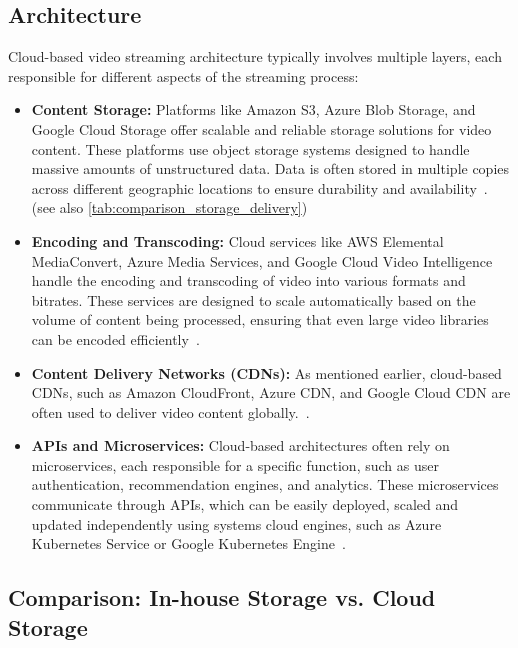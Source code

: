 \subsection{Architecture}
Cloud-based video streaming architecture typically involves multiple layers, each responsible for different aspects of the streaming process:

\begin{itemize}
    \item \textbf{Content Storage:} Platforms like Amazon S3, Azure Blob Storage, and Google Cloud Storage offer scalable and reliable storage solutions for video content. These platforms use object storage systems designed to handle massive amounts of unstructured data. Data is often stored in multiple copies across different geographic locations to ensure durability and availability~\parencite{cloud_streaming}. (see also \autoref{tab:comparison_storage_delivery})
    
    \item \textbf{Encoding and Transcoding:} Cloud services like AWS Elemental MediaConvert, Azure Media Services, and Google Cloud Video Intelligence handle the encoding and transcoding of video into various formats and bitrates. These services are designed to scale automatically based on the volume of content being processed, ensuring that even large video libraries can be encoded efficiently~\parencite{cloud_streaming}.
    
    \item \textbf{Content Delivery Networks (CDNs):} As mentioned earlier, cloud-based \ac{CDN}s, such as Amazon CloudFront, Azure CDN, and Google Cloud CDN are often used to deliver video content globally.~\parencite{cloud_streaming}.
    
    \item \textbf{\ac{API}s and Microservices:} Cloud-based architectures often rely on microservices, each responsible for a specific function, such as user authentication, recommendation engines, and analytics. These microservices communicate through \ac{API}s, which can be easily deployed, scaled and updated independently using systems cloud engines, such as Azure Kubernetes Service or Google Kubernetes Engine~\parencite{cloud_streaming}.
\end{itemize}

\subsection{Comparison: In-house Storage vs. Cloud Storage}

